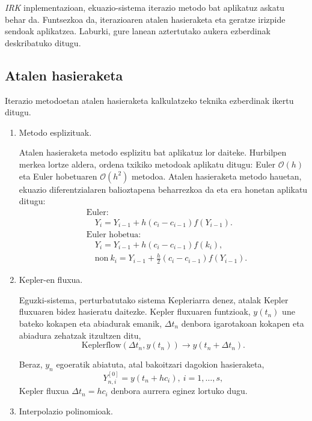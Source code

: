 \emph{IRK} inplementazioan, ekuazio-sistema iterazio metodo bat aplikatuz askatu behar da. Funtsezkoa da, iterazioaren atalen hasieraketa eta geratze irizpide sendoak aplikatzea. Laburki, gure lanean aztertutako aukera ezberdinak deskribatuko ditugu.  

\subsection*{Atalen hasieraketa}

Iterazio metodoetan  atalen hasieraketa kalkulatzeko teknika ezberdinak ikertu ditugu. 
\begin{enumerate}
\item Metodo esplizituak.

Atalen hasieraketa metodo esplizitu bat aplikatuz lor daiteke. Hurbilpen merkea lortze aldera, ordena txikiko metodoak aplikatu ditugu: 
Euler  $\mathcal{O}(h)$ eta Euler hobetuaren $\mathcal{O}(h^2)$ metodoa. Atalen hasieraketa metodo hauetan, ekuazio diferentzialaren balioztapena beharrezkoa da eta era honetan aplikatu ditugu:
\begin{align*}
&\text{Euler}:\\
& \quad Y_i=Y_{i-1}+h (c_i-c_{i-1}) f(Y_{i-1}).\\
&\text{Euler hobetua}: \\
& \quad Y_i=Y_{i-1}+h (c_i-c_{i-1}) f(k_i),\\
& \quad \text{non} \ k_i=Y_{i-1}+\frac{h}{2} (c_i-c_{i-1}) f(Y_{i-1}).
\end{align*} 


\item Kepler-en fluxua.

Eguzki-sistema, perturbatutako sistema Kepleriarra denez, atalak Kepler fluxuaren bidez hasieratu daitezke. Kepler fluxuaren funtzioak, $y(t_n)$ une bateko kokapen eta abiadurak emanik, $\Delta t_n$ denbora igarotakoan kokapen eta abiadura zehatzak itzultzen ditu,
\begin{equation*}
\text{Keplerflow}(\Delta t_n, y(t_n)) \rightarrow y(t_n+\Delta t_n).
\end{equation*}

Beraz, $y_n$ egoeratik abiatuta, atal bakoitzari dagokion hasieraketa,
\begin{equation*}
Y_{n,i}^{[0]}=y(t_n+hc_i), \ i=1,\dots,s,
\end{equation*}
Kepler fluxua $\Delta t_n=hc_i$ denbora aurrera eginez lortuko dugu.  

\item Interpolazio polinomioak.


\end{enumerate}
